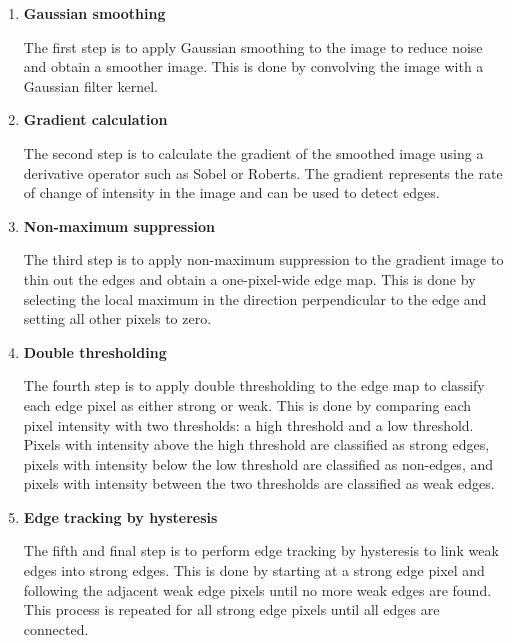 \begin{enumerate}

    \item \textbf{Gaussian smoothing}

          The first step is to apply Gaussian smoothing to the image to reduce noise and
          obtain a smoother image. This is done by convolving the image with a Gaussian
          filter kernel.

    \item \textbf{Gradient calculation}

          The second step is to calculate the gradient of the smoothed image using a
          derivative operator such as Sobel or Roberts. The gradient represents the rate
          of change of intensity in the image and can be used to detect edges.

    \item \textbf{Non-maximum suppression}

          The third step is to apply non-maximum suppression to the gradient image to
          thin out the edges and obtain a one-pixel-wide edge map. This is done by
          selecting the local maximum in the direction perpendicular to the edge and
          setting all other pixels to zero.

    \item \textbf{Double thresholding}

          The fourth step is to apply double thresholding to the edge map to classify
          each edge pixel as either strong or weak. This is done by comparing each pixel
          intensity with two thresholds: a high threshold and a low threshold. Pixels
          with intensity above the high threshold are classified as strong edges, pixels
          with intensity below the low threshold are classified as non-edges, and pixels
          with intensity between the two thresholds are classified as weak edges.

    \item \textbf{Edge tracking by hysteresis}

          The fifth and final step is to perform edge tracking by hysteresis to link weak
          edges into strong edges. This is done by starting at a strong edge pixel and
          following the adjacent weak edge pixels until no more weak edges are found.
          This process is repeated for all strong edge pixels until all edges are
          connected.

\end{enumerate}

